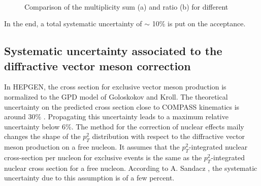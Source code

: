 \begin{figure}[!h]
  \centering
	 \\
	\caption{Comparison of the multiplicity sum (a) and ratio (b) for different }
	\label{pic:Zvertexsum}
\end{figure}

In the end, a total systematic uncertainty of $\sim$ 10\% is put on the acceptance.


\subsection{Systematic uncertainty associated to the diffractive vector meson correction}

In HEPGEN, the cross section for exclusive vector meson production is normalized to the GPD model of Goloskokov and Kroll. The theoretical uncertainty on the predicted cross section close to COMPASS kinematics is around 30\% \cite{Goloskokov}. Propagating this uncertainty leads to a maximum relative uncertainty below 6\%.
The method for the correction of nuclear effects maily changes the shape of the $p_T^2$ distribution with respect to the diffractive vector meson production on a free nucleon. It assumes that the $p_T^2$-integrated nuclear cross-section per nucleon for exclusive events is the same as the $p_T^2$-integrated nuclear cross section for a free nucleon. According to A. Sandacz \cite{Hepgen}, the systematic uncertainty due to this assumption is of a few percent.

